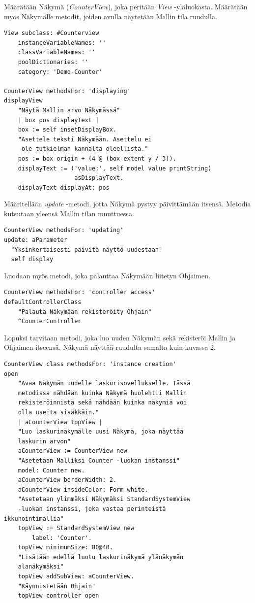 \documentclass[utf8]{gradu3}
\begin{document}
Määrätään Näkymä (\emph{CounterView}), joka peritään \emph{View} -yläluokasta. Määrätään
myös Näkymälle metodit, joiden avulla näytetään Mallin tila ruudulla.
\begin{lstlisting}[language=Smalltalk]
View subclass: #Counterview
	instanceVariableNames: ''
	classVariableNames: ''
	poolDictionaries: ''
	category: 'Demo-Counter'

CounterView methodsFor: 'displaying'
displayView
	"Näytä Mallin arvo Näkymässä"
	| box pos displayText |
	box := self insetDisplayBox.
	"Asettele teksti Näkymään. Asettelu ei
	 ole tutkielman kannalta oleellista."
	pos := box origin + (4 @ (box extent y / 3)).
	displayText := ('value:', self model value printString)
					asDisplayText.
	displayText displayAt: pos
\end{lstlisting}
Määritellään \emph{update} -metodi, jotta Näkymä pystyy päivittämään itsensä. Metodia kutsutaan
yleensä Mallin tilan muuttuessa.
\begin{lstlisting}[language=Smalltalk]
CounterView methodsFor: 'updating'
update: aParameter
  "Yksinkertaisesti päivitä näyttö uudestaan"
  self display
\end{lstlisting}
Luodaan myös metodi, joka palauttaa Näkymään liitetyn Ohjaimen.
\begin{lstlisting}[language=Smalltalk]
CounterView methodsFor: 'controller access'
defaultControllerClass
	"Palauta Näkymään rekisteröity Ohjain"
	^CounterController
\end{lstlisting}
Lopuksi tarvitaan metodi, joka luo uuden Näkymän sekä rekisteröi Mallin ja Ohjaimen itseensä. Näkymä näyttää ruudulta
samalta kuin kuvassa 2.
\begin{lstlisting}[language=Smalltalk]
CounterView class methodsFor: 'instance creation'
open
	"Avaa Näkymän uudelle laskurisovellukselle. Tässä 
	metodissa nähdään kuinka Näkymä huolehtii Mallin 
	rekisteröinnistä sekä nähdään kuinka näkymiä voi 
	olla useita sisäkkäin."
	| aCounterView topView |
	"Luo laskurinäkymälle uusi Näkymä, joka näyttää 
	laskurin arvon"
	aCounterView := CounterView new
	"Asetetaan Malliksi Counter -luokan instanssi"
	model: Counter new.
	aCounterView borderWidth: 2.
	aCounterView insideColor: Form white.
	"Asetetaan ylimmäksi Näkymäksi StandardSystemView 
	-luokan instanssi, joka vastaa perinteistä
ikkunointimallia"
	topView := StandardSystemView new
		label: 'Counter'.
	topView minimumSize: 80@40.
	"Lisätään edellä luotu laskurinäkymä ylänäkymän 
	alanäkymäksi"
	topView addSubView: aCounterView.
	"Käynnistetään Ohjain"
	topView controller open
\end{lstlisting}
\end{document}
